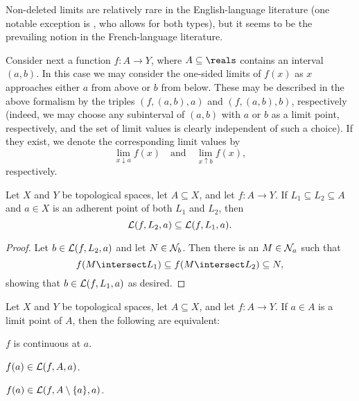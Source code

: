\documentclass[article, a4paper, 11pt, oneside]{memoir}
\numberwithin{equation}{chapter}
\begin{document}
\begin{example}
\begin{enumexample}
        Non-deleted limits are relatively rare in the English-language literature (one notable exception is \textcite{taoanalysisI,taoanalysisII}, who allows for both types), but it seems to be the prevailing notion in the French-language literature.
        
        \item Consider next a function $f \colon A \to Y$, where $A \subseteq \reals$ contains an interval $(a,b)$. In this case we may consider the one-sided limits of $f(x)$ as $x$ approaches either $a$ from above or $b$ from below. These may be described in the above formalism by the triples $(f,(a,b),a)$ and $(f,(a,b),b)$, respectively (indeed, we may choose any subinterval of $(a,b)$ with $a$ or $b$ as a limit point, respectively, and the set of limit values is clearly independent of such a choice). If they exist, we denote the corresponding limit values by
        \begin{equation*}
            \lim_{x \downarrow a} f(x)
            \quad \text{and} \quad
            \lim_{x \uparrow b} f(x),
        \end{equation*}
        respectively.
    \end{enumexample}
\end{example}


\begin{lemma}
    Let $X$ and $Y$ be topological spaces, let $A \subseteq X$, and let $f \colon A \to Y$. If $L_1 \subseteq L_2 \subseteq A$ and $a \in X$ is an adherent point of both $L_1$ and $L_2$, then
    \begin{equation*}
        \mathcal{L}(f,L_2,a)
            \subseteq \mathcal{L}(f,L_1,a).
    \end{equation*}
\end{lemma}

\begin{proof}
    Let $b \in \mathcal{L}(f,L_2,a)$ and let $N \in \mathcal{N}_{b}$. Then there is an $M \in \mathcal{N}_{a}$ such that
    \begin{equation*}
        f(M \intersect L_1)
            \subseteq f(M \intersect L_2)
            \subseteq N,
    \end{equation*}
    showing that $b \in \mathcal{L}(f,L_1,a)$ as desired.
\end{proof}


\begin{proposition}
    Let $X$ and $Y$ be topological spaces, let $A \subseteq X$, and let $f \colon A \to Y$. If $a \in A$ is a limit point of $A$, then the following are equivalent:
    \begin{enumprop}
        \item $f$ is continuous at $a$.
        \item $f(a) \in \mathcal{L}(f, A, a)$.
        \item $f(a) \in \mathcal{L}(f, A \setminus \{a\}, a)$.
    \end{enumprop}
\end{proposition}
\end{document}

